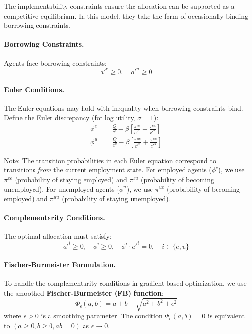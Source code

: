 The implementability constraints ensure the allocation can be supported as a competitive equilibrium. In this model, they take the form of occasionally binding borrowing constraints.

\paragraph{Borrowing Constraints.}
Agents face borrowing constraints:
\begin{equation}
    a'^e \geq 0, \quad a'^u \geq 0
\end{equation}

\paragraph{Euler Conditions.}
The Euler equations may hold with inequality when borrowing constraints bind. Define the Euler discrepancy (for log utility, $\sigma = 1$):
\begin{align}
    \phi^e &= \frac{Q}{c^e} - \beta \left[ \frac{\pi^{ee}}{c'^e} + \frac{\pi^{eu}}{c'^u} \right] \label{eq:euler_e}\\
    \phi^u &= \frac{Q}{c^u} - \beta \left[ \frac{\pi^{ue}}{c'^e} + \frac{\pi^{uu}}{c'^u} \right] \label{eq:euler_u}
\end{align}

Note: The transition probabilities in each Euler equation correspond to transitions \emph{from} the current employment state. For employed agents ($\phi^e$), we use $\pi^{ee}$ (probability of staying employed) and $\pi^{eu}$ (probability of becoming unemployed). For unemployed agents ($\phi^u$), we use $\pi^{ue}$ (probability of becoming employed) and $\pi^{uu}$ (probability of staying unemployed).

\paragraph{Complementarity Conditions.}
The optimal allocation must satisfy:
\begin{equation}\label{eq:complementarity}
    a'^i \geq 0, \quad \phi^i \geq 0, \quad \phi^i \cdot a'^i = 0, \quad i \in \{e, u\}
\end{equation}

\paragraph{Fischer-Burmeister Formulation.}
To handle the complementarity conditions in gradient-based optimization, we use the smoothed \textbf{Fischer-Burmeister (FB) function}:
\begin{equation}\label{eq:fb_function}
    \Phi_\epsilon(a, b) = a + b - \sqrt{a^2 + b^2 + \epsilon^2}
\end{equation}
where $\epsilon > 0$ is a smoothing parameter. The condition $\Phi_\epsilon(a, b) = 0$ is equivalent to $(a \geq 0, b \geq 0, ab = 0)$ as $\epsilon \to 0$.

